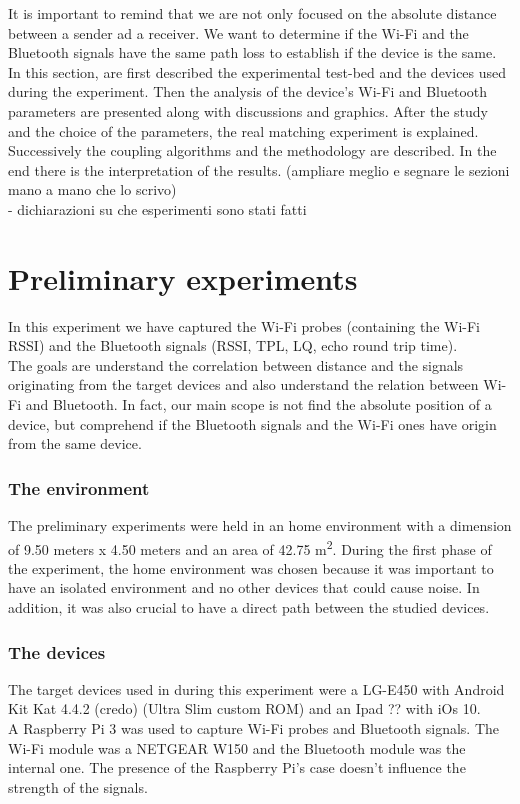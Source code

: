 \linebreak
It is important to remind that we are not only focused on the absolute distance between a sender ad a receiver. We want to determine if the Wi-Fi and the Bluetooth signals have the same path loss to establish if the device is the same.\\
\linebreak  
In this section, are first described the experimental test-bed and the devices used during the experiment. Then the analysis of the device's Wi-Fi and Bluetooth parameters are presented along with discussions and graphics. After the study and the choice of the parameters, the real matching experiment is explained. Successively the coupling algorithms and the methodology are described. In the end there is the interpretation of the results. (ampliare meglio e segnare le sezioni mano a mano che lo scrivo)\\

- dichiarazioni su che esperimenti sono stati fatti\\
\section{Preliminary experiments}
In this experiment we have captured the Wi-Fi probes (containing the Wi-Fi RSSI) and the Bluetooth signals (RSSI, TPL, LQ, echo round trip time).\\
The goals are understand the correlation between distance and the signals originating from the target devices and also understand the relation between Wi-Fi and Bluetooth. In fact, our main scope is not find the absolute position of a device, but comprehend if the Bluetooth signals and the Wi-Fi ones have origin from the same device. 
\subsubsection{The environment}
The preliminary experiments were held in an home environment with a dimension of 9.50 meters x 4.50 meters and an area of 42.75 m\textsuperscript{2}.
During the first phase of the experiment, the home environment was chosen because it was important to have an isolated environment and no other devices that could cause noise. In addition, it was also crucial to have a direct path between the studied devices.\\
\subsubsection{The devices}
The target devices used in during this experiment were a LG-E450 with Android Kit Kat 4.4.2 (credo) (Ultra Slim custom ROM) and an Ipad ?? with iOs 10. \\
\linebreak
A Raspberry Pi 3 was used to capture Wi-Fi probes and Bluetooth signals. The Wi-Fi module was a NETGEAR W150 and the Bluetooth module was the internal one. The presence of the Raspberry Pi's case doesn't influence the strength of the signals.
